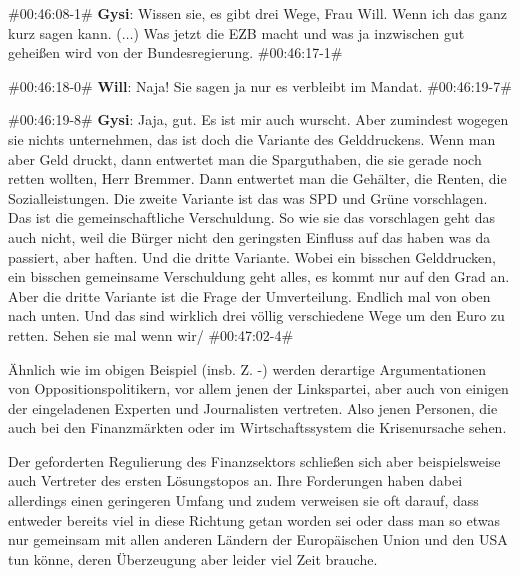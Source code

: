 \begin{description}
	\begin{linenumbers}[1]
		\item \#00:46:08-1\# \textbf{Gysi}: Wissen sie, es gibt drei Wege, Frau Will. Wenn ich das ganz kurz sagen kann. ($\ldots$) Was jetzt die EZB macht und was ja inzwischen gut geheißen wird von der Bundesregierung. \#00:46:17-1\# 
		
		\item \#00:46:18-0\# \textbf{Will}: Naja! Sie sagen ja nur es verbleibt im Mandat. \#00:46:19-7\# 
		
		\item \#00:46:19-8\# \textbf{Gysi}: Jaja, gut. Es ist mir auch wurscht. Aber zumindest wogegen sie nichts unternehmen, das ist doch die Variante des Gelddruckens. Wenn man aber Geld druckt, dann entwertet man die Sparguthaben, die sie gerade noch retten wollten, Herr Bremmer. Dann entwertet man die Gehälter, die Renten, die Sozialleistungen. Die zweite Variante ist das was SPD und Grüne vorschlagen. Das ist die gemeinschaftliche Verschuldung. So wie sie das vorschlagen geht das auch nicht, weil die Bürger nicht den geringsten Einfluss auf das haben was da passiert, aber haften. Und die dritte Variante. Wobei ein bisschen Gelddrucken, ein bisschen gemeinsame Verschuldung geht alles, es kommt nur auf den Grad an. Aber die dritte Variante ist die Frage der Umverteilung. Endlich mal von oben nach unten. Und das sind wirklich drei völlig verschiedene Wege um den Euro zu retten. Sehen sie mal wenn wir/ \#00:47:02-4\# 
	\end{linenumbers}
\end{description}

Ähnlich wie im obigen Beispiel (insb. Z. -) werden derartige Argumentationen  von Oppositionspolitikern, vor allem jenen der Linkspartei, aber auch von einigen der eingeladenen Experten und Journalisten vertreten. Also jenen Personen, die auch bei den Finanzmärkten oder im Wirtschaftssystem die Krisenursache sehen.

Der geforderten Regulierung des Finanzsektors schließen sich aber beispielsweise auch Vertreter des ersten Lösungstopos an. Ihre Forderungen haben dabei allerdings einen geringeren Umfang und zudem verweisen sie oft darauf, dass entweder bereits viel in diese Richtung getan worden sei oder dass man so etwas nur gemeinsam mit allen anderen Ländern der Europäischen Union und den USA tun könne, deren Überzeugung aber leider viel Zeit brauche.

